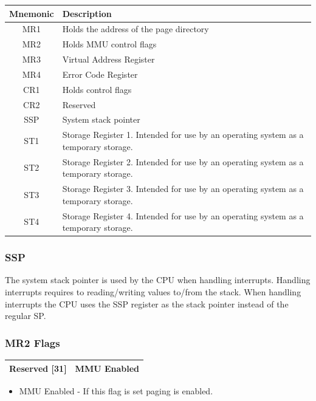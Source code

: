 \begin{tabular}{ | c | l | }
	\hline                        
	\textbf{Mnemonic} & \textbf{Description} \\
	\hline
	MR1 & Holds the address of the page directory\\
	\hline
	MR2 & Holds MMU control flags \\
	\hline
	MR3 & Virtual Address Register \\
	\hline
	MR4 & Error Code Register \\
	\hline
	CR1 & Holds control flags \\
	\hline
	CR2 & Reserved \\
	\hline
	SSP & System stack pointer \\
	\hline
        ST1 & Storage Register 1. Intended for use by an operating system as a temporary storage. \\
	\hline
	ST2 & Storage Register 2. Intended for use by an operating system as a temporary storage. \\
	\hline
	ST3 & Storage Register 3. Intended for use by an operating system as a temporary storage. \\
	\hline
	ST4 & Storage Register 4. Intended for use by an operating system as a temporary storage. \\
	\hline
\end{tabular}

\subsubsection{SSP}

The system stack pointer is used by the CPU when handling interrupts. Handling interrupts requires to reading/writing values to/from the stack. 
When handling interrupts the CPU uses the SSP register as the stack pointer instead of the regular SP. 

\subsubsection{MR2 Flags}

\begin{tabular}{| r | r |}
	\hline
	Reserved [31] & MMU Enabled \\
	\hline
\end{tabular}

\begin{itemize}
	\item MMU Enabled - If this flag is set paging is enabled. 
\end{itemize}

